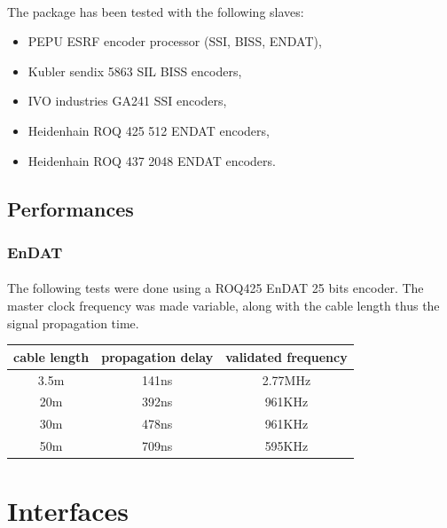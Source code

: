 \documentclass[12pt]{article}
\begin{document}
\paragraph{}
The package has been tested with the following slaves:
\begin{itemize}
  \item PEPU ESRF encoder processor (SSI, BISS, ENDAT),
  \item Kubler sendix 5863 SIL BISS encoders,
  \item IVO industries GA241 SSI encoders,
  \item Heidenhain ROQ 425 512 ENDAT encoders,
  \item Heidenhain ROQ 437 2048 ENDAT encoders.
\end{itemize}


\subsection{Performances}

\subsubsection{EnDAT}
\paragraph{}
The following tests were done using a ROQ425 EnDAT 25 bits encoder. The master
clock frequency was made variable, along with the cable length thus the signal
propagation time.

\begin{center}
  \begin{tabular}{ | c | c | c |}
    \hline
    cable length & propagation delay & validated frequency \\ \hline
    3.5m         & 141ns             & 2.77MHz             \\ \hline
    20m          & 392ns             & 961KHz              \\ \hline
    30m          & 478ns             & 961KHz              \\ \hline
    50m          & 709ns             & 595KHz              \\ \hline
    \end{tabular}
\end{center}


\newpage
\section{Interfaces}
\end{document}
